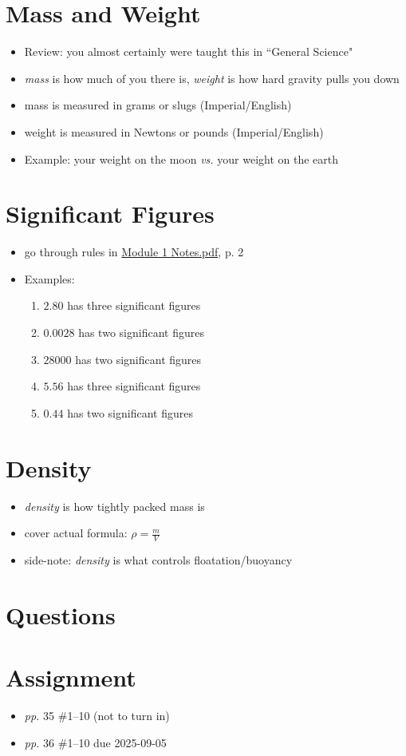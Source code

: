 \documentclass[10pt, oneside]{article}   	%
\begin{document}
\section*{Mass and Weight}
\begin{itemize}
\item Review: you almost certainly were taught this in  ``General Science"
\item \emph{mass} is how much of you there is, \emph{weight} is how hard gravity pulls you down
\item mass is measured in grams or slugs (Imperial/English)
\item weight is measured in Newtons or pounds (Imperial/English)
\item Example: your weight on the moon \emph{vs.} your weight on the earth 
\end{itemize}

\section*{Significant Figures}
\begin{itemize}
\item go through rules in \href{https://drive.google.com/file/d/1p-i3eBQ1MXrmtNDu9kW5U6uMlN-BSEsR/view?usp=sharing}{Module 1 Notes.pdf}, p. 2
\item Examples:
\begin{enumerate}
\item $2.80$ has three significant figures
\item $0.0028$ has two significant figures
\item $28000$ has two significant figures
\item $5.56$ has three significant figures
\item $0.44$ has two significant figures
\end{enumerate}
\end{itemize}

\section*{Density}
\begin{itemize}
\item \emph{density} is how tightly packed mass is
\item cover actual formula: $\rho = \frac{m}{V} $
\item side-note: \emph{density} is what controls floatation/buoyancy
\end{itemize}

\section*{Questions}

\section*{Assignment}
\begin{itemize}
\item \emph{pp.} 35 \#1--10 (not to turn in)
\item \emph{pp.} 36 \#1--10 due 2025-09-05
\end{itemize}
\end{document}
